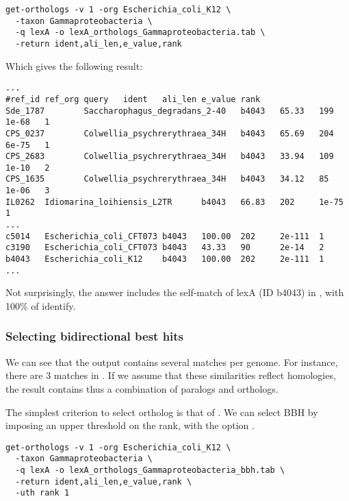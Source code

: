 \begin{small}
\begin{verbatim}
get-orthologs -v 1 -org Escherichia_coli_K12 \
  -taxon Gammaproteobacteria \
  -q lexA -o lexA_orthologs_Gammaproteobacteria.tab \
  -return ident,ali_len,e_value,rank 
\end{verbatim}
\end{small}

Which gives the following result:

\begin{scriptsize}
\begin{verbatim}
...
#ref_id ref_org query   ident   ali_len e_value rank
Sde_1787        Saccharophagus_degradans_2-40   b4043   65.33   199     1e-68   1
CPS_0237        Colwellia_psychrerythraea_34H   b4043   65.69   204     6e-75   1
CPS_2683        Colwellia_psychrerythraea_34H   b4043   33.94   109     1e-10   2
CPS_1635        Colwellia_psychrerythraea_34H   b4043   34.12   85      1e-06   3
IL0262  Idiomarina_loihiensis_L2TR      b4043   66.83   202     1e-75   1
...
c5014   Escherichia_coli_CFT073 b4043   100.00  202     2e-111  1
c3190   Escherichia_coli_CFT073 b4043   43.33   90      2e-14   2
b4043   Escherichia_coli_K12    b4043   100.00  202     2e-111  1
...
\end{verbatim}
\end{scriptsize}

Not surprisingly, the answer includes the self-match of lexA (ID
b4043) in , with 100\% of identify.

\subsubsection{Selecting bidirectional best hits}

We can see that the output contains several matches per genome. For
instance, there are 3 matches in . If we assume that these similarities reflect homologies, the
result contains thus a combination of paralogs and orthologs. 

The simplest criterion to select ortholog is that of
\concept{bidirectional best hit (BBH)}. We can select BBH by imposing
an upper threshold on the rank, with the option .

\begin{small}
\begin{verbatim}
get-orthologs -v 1 -org Escherichia_coli_K12 \
  -taxon Gammaproteobacteria \
  -q lexA -o lexA_orthologs_Gammaproteobacteria_bbh.tab \
  -return ident,ali_len,e_value,rank \
  -uth rank 1 
\end{verbatim}
\end{small}

